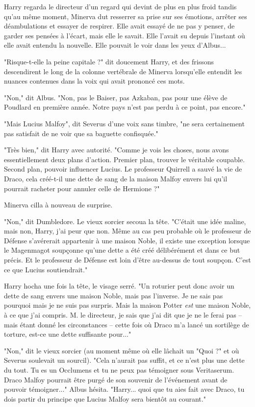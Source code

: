 Harry regarda le directeur d'un regard qui devint de plus en plus froid tandis qu'au même moment, Minerva dut resserrer sa prise sur ses émotions, arrêter ses déambulations et essayer de respirer. Elle avait essayé de ne pas y penser, de garder ses pensées à l'écart, mais elle le savait. Elle l'avait su depuis l'instant où elle avait entendu la nouvelle. Elle pouvait le voir dans les yeux d'Albus...

"Risque-t-elle la peine capitale ?" dit doucement Harry, et des frissons descendirent le long de la colonne vertébrale de Minerva lorsqu'elle entendit les nuances contenues dans la voix qui avait prononcé ces mots.

"Non," dit Albus. "Non, pas le Baiser, pas Azkaban, pas pour une élève de Poudlard en première année. Notre pays n'est pas perdu à ce point, pas encore."

"Mais Lucius Malfoy", dit Severus d'une voix sans timbre, "ne sera certainement pas satisfait de ne voir que sa baguette confisquée."

"Très bien," dit Harry avec autorité. "Comme je vois les choses, nous avons essentiellement deux plans d'action. Premier plan, trouver le véritable coupable. Second plan, pouvoir influencer Lucius. Le professeur Quirrell a sauvé la vie de Draco, cela créé-t-il une dette de sang de la maison Malfoy envers lui qu'il pourrait racheter pour annuler celle de Hermione ?"

Minerva cilla à nouveau de surprise.

"Non," dit Dumbledore. Le vieux sorcier secoua la tête. "C'était une idée maline, mais non, Harry, j'ai peur que non. Même au cas peu probable où le professeur de Défense s'avérerait appartenir à une maison Noble, il existe une exception lorsque le Magenmagot soupçonne qu'une dette a été créé délibérément et dans ce but précis. Et le professeur de Défense est loin d'être au-dessus de tout soupçon. C'est ce que Lucius soutiendrait."

Harry hocha une fois la tête, le visage serré. "Un roturier peut donc avoir un dette de sang envers une maison Noble, mais pas l'inverse. Je ne sais pas pourquoi mais je ne suis pas surpris. Mais la maison Potter \emph{est}  une maison Noble, à ce que j'ai compris. M. le directeur, je sais que j'ai dit que je ne le ferai pas – mais étant donné les circonstances – cette fois où Draco m'a lancé un sortilège de torture, est-ce une dette suffisante pour..."

"Non," dit le vieux sorcier (au moment même où elle lâchait un "Quoi ?" et où Severus soulevait un sourcil). "Cela n'aurait pas suffit, et ce n'est plus une dette du tout. Tu es un Occlumens et tu ne peux pas témoigner sous Veritaserum. Draco Malfoy pourrait être purgé de son souvenir de l'événement avant de pouvoir témoigner..." Albus hésita. "Harry... quoi que tu aies fait avec Draco, tu dois partir du principe que Lucius Malfoy sera bientôt au courant."


